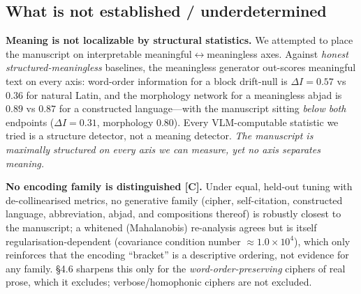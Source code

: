 \documentclass[11pt]{article}
\newcommand{\grade}[1]{{\small\textbf{[#1]}}}
\begin{document}
\subsection{What is not established / underdetermined}
\textbf{Meaning is not localizable by structural statistics.} We attempted to place
the manuscript on interpretable meaningful$\leftrightarrow$meaningless axes. Against
\emph{honest structured-meaningless} baselines, the meaningless generator out-scores
meaningful text on every axis: word-order information for a block drift-null is
$\Delta I = 0.57$ vs $0.36$ for natural Latin, and the morphology network for a
meaningless abjad is $0.89$ vs $0.87$ for a constructed language---with the manuscript
sitting \emph{below both} endpoints ($\Delta I = 0.31$, morphology $0.80$). Every
VLM-computable statistic we tried is a structure detector, not a meaning detector.
\emph{The manuscript is maximally structured on every axis we can measure, yet no axis
separates meaning.}

\textbf{No encoding family is distinguished \grade{C}.} Under equal, held-out tuning
with de-collinearised metrics, no generative family (cipher, self-citation,
constructed language, abbreviation, abjad, and compositions thereof) is robustly
closest to the manuscript; a whitened (Mahalanobis) re-analysis agrees but is itself
regularisation-dependent (covariance condition number $\approx 1.0\times10^{4}$),
which only reinforces that the encoding ``bracket'' is a descriptive ordering, not
evidence for any family. \S4.6 sharpens this only for the \emph{word-order-preserving}
ciphers of real prose, which it excludes; verbose/homophonic ciphers are not excluded.
\end{document}
